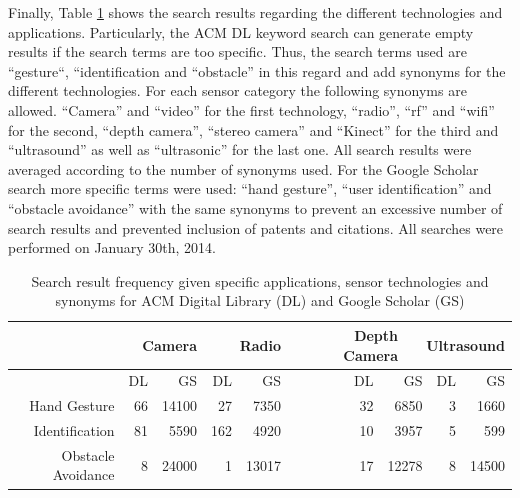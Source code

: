 Finally, Table \ref{tab:bench_search_res} shows the search results regarding the different technologies and applications. Particularly, the ACM DL keyword search can generate empty results if the search terms are too specific. Thus, the search terms used are “gesture“, “identification and “obstacle” in this regard and add synonyms for the different technologies. For each sensor category the following synonyms are allowed. “Camera” and “video” for the first technology, “radio”, “rf” and “wifi” for the second, “depth camera”, “stereo camera” and “Kinect” for the third and “ultrasound” as well as “ultrasonic” for the last one. All search results were averaged according to the number of synonyms used. For the Google Scholar search more specific terms were used: “hand gesture”, “user identification” and “obstacle avoidance” with the same synonyms to prevent an excessive number of search results and prevented inclusion of patents and citations. All searches were performed on January 30th, 2014.
\begin{table}[htbp]
  \centering
  \caption{Search result frequency given specific applications, sensor technologies and synonyms for ACM Digital Library (DL) and Google Scholar (GS)}
    \begin{tabular}{rrrrrrrrrr}
    \toprule
          & \multicolumn{2}{r}{Camera} & \multicolumn{2}{r}{Radio} & \multicolumn{2}{r}{Depth Camera} & \multicolumn{3}{r}{Ultrasound} \\
    \midrule
          & DL    & GS    & DL    & GS    & DL    & \multicolumn{2}{r}{GS} & DL    & GS \\
    Hand Gesture & 66    & 14100 & 27    & 7350  & 32    & \multicolumn{2}{r}{6850} & 3     & 1660 \\
    Identification & 81    & 5590  & 162   & 4920  & 10    & \multicolumn{2}{r}{3957} & 5     & 599 \\
    Obstacle Avoidance & 8     & 24000 & 1     & 13017 & 17    & \multicolumn{2}{r}{12278} & 8     & 14500 \\
    \bottomrule
    \end{tabular}%
  \label{tab:bench_search_res}%
\end{table}%

